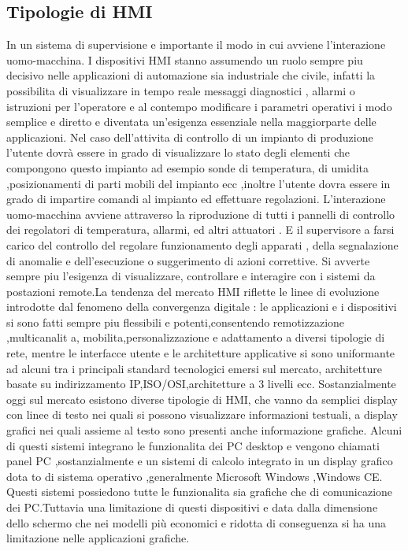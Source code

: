 \documentclass[12pt, a4paper, oneside]{book}
\begin{document}
\subsection{Tipologie di HMI}
In un sistema di supervisione e importante il modo in cui avviene l’interazione uomo-macchina. I dispositivi HMI stanno assumendo un ruolo sempre piu decisivo nelle applicazioni di automazione sia industriale che civile, infatti la possibilita di visualizzare in tempo reale messaggi diagnostici , allarmi o istruzioni per l’operatore e al contempo modificare i parametri operativi i modo semplice e diretto e diventata un’esigenza essenziale nella maggiorparte delle applicazioni. Nel caso dell’attivita di controllo di un impianto di produzione l’utente dovrà essere in grado di visualizzare lo stato degli elementi che compongono questo impianto ad esempio sonde di temperatura, di umidita ,posizionamenti di parti mobili del impianto ecc ,inoltre l’utente dovra essere in grado di impartire comandi al impianto ed effettuare regolazioni. L’interazione uomo-macchina avviene attraverso la riproduzione di tutti i pannelli di controllo dei regolatori di temperatura, allarmi, ed altri attuatori . E il supervisore a farsi carico del controllo del regolare funzionamento degli apparati , della segnalazione di anomalie e dell’esecuzione o suggerimento di azioni correttive. Si avverte sempre piu l’esigenza di visualizzare, controllare e interagire con i sistemi da postazioni remote.La tendenza del mercato HMI riflette le linee di evoluzione introdotte dal fenomeno della convergenza digitale : le applicazioni e i dispositivi si sono fatti sempre piu flessibili e potenti,consentendo remotizzazione ,multicanalit a, mobilita,personalizzazione e adattamento a diversi tipologie di rete, mentre le interfacce utente e le architetture applicative si sono uniformante ad alcuni tra i principali standard tecnologici emersi sul mercato, architetture basate su indirizzamento IP,ISO/OSI,architetture a 3 livelli ecc. Sostanzialmente oggi sul mercato esistono diverse tipologie di HMI, che vanno da semplici display con linee di testo nei quali si possono visualizzare informazioni testuali, a display grafici nei quali assieme al testo sono presenti anche informazione grafiche. Alcuni di questi sistemi integrano le funzionalita dei PC desktop e vengono chiamati panel PC ,sostanzialmente e un sistemi di calcolo integrato in un display grafico dota to di sistema operativo ,generalmente Microsoft Windows ,Windows CE.
Questi sistemi possiedono tutte le funzionalita sia grafiche che di comunicazione dei PC.Tuttavia una limitazione di questi dispositivi e data dalla dimensione dello schermo che nei modelli più economici e ridotta di conseguenza si ha una limitazione nelle applicazioni grafiche.
\end{document}
